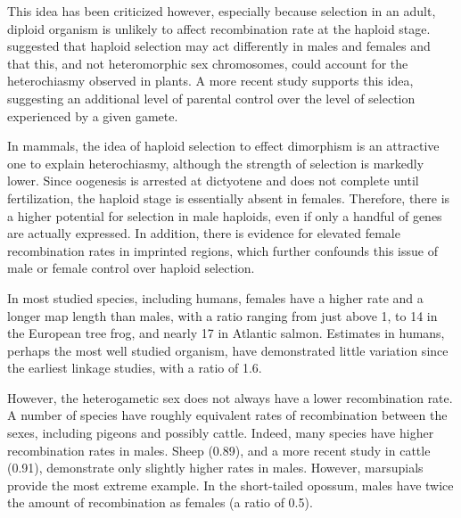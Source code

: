 This idea has been criticized however, especially because selection in an adult, diploid organism is unlikely to affect recombination rate at the haploid stage\cite{Lenormand2003}.
\citet{Lenormand2005} suggested that haploid selection may act differently in males and females and that this, and not heteromorphic sex chromosomes, could account for the heterochiasmy observed in plants.
A more recent study\cite{Otto2015} supports this idea, suggesting an additional level of parental control over the level of selection experienced by a given gamete.

In mammals, the idea of haploid selection to effect dimorphism is an attractive one to explain heterochiasmy, although the strength of selection is markedly lower.
Since oogenesis is arrested at dictyotene and does not complete until fertilization, the haploid stage is essentially absent in females.
Therefore, there is a higher potential for selection in male haploids, even if only a handful of genes are actually expressed\cite{Dadoune2004}.
In addition, there is evidence for elevated female recombination rates in imprinted regions\cite{Lercher2003}, which further confounds this issue of male or female control over haploid selection.

In most studied species, including humans, females have a higher rate and a longer map length than males, with a ratio ranging from just above 1, to 14 in the European tree frog\cite{Berset-Brandli2008}, and nearly 17 in Atlantic salmon\cite{Danzmann2005}.
Estimates in humans, perhaps the most well studied organism, have demonstrated little variation since the earliest linkage studies, with a ratio of 1.6.

However, the heterogametic sex does not always have a lower recombination rate.
A number of species have roughly equivalent rates of recombination between the sexes, including pigeons\cite{Pigozzi1999} and possibly cattle\cite{Kappes1997}. %
Indeed, many species have higher recombination rates in males.
Sheep\cite{Crawford1995} (0.89), and a more recent study in cattle\cite{Ma2015} (0.91), demonstrate only slightly higher rates in males.
However, marsupials provide the most extreme example. 
In the short-tailed opossum\cite{Samollow2004},  males have twice the amount of recombination as females (a ratio of 0.5).



